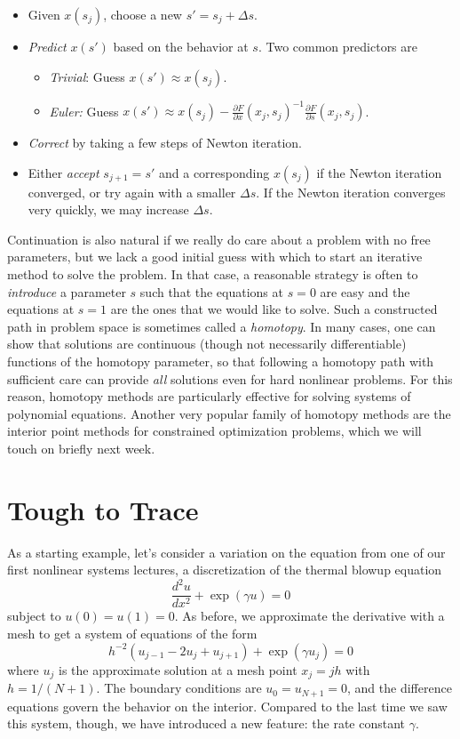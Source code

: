 \documentclass[12pt, leqno]{article} %
\providecommand{\tightlist}{%
  \setlength{\itemsep}{0pt}\setlength{\parskip}{0pt}}
\begin{document}
\begin{itemize}
\tightlist
\item
  Given \(x(s_j)\), choose a new \(s' = s_j + \Delta s\).
\item
  \emph{Predict} \(x(s')\) based on the behavior at \(s\). Two common
  predictors are

  \begin{itemize}
  \tightlist
  \item
    \emph{Trivial}: Guess \(x(s') \approx x(s_j)\).
  \item
    \emph{Euler:} Guess
    \(x(s') \approx x(s_j) - \frac{\partial F}{\partial x}(x_j,s_j)^{-1} \frac{\partial F}{\partial s}(x_j,s_j)\).
  \end{itemize}
\item
  \emph{Correct} by taking a few steps of Newton iteration.
\item
  Either \emph{accept} \(s_{j+1} = s'\) and a corresponding \(x(s_j)\)
  if the Newton iteration converged, or try again with a smaller
  \(\Delta s\). If the Newton iteration converges very quickly, we may
  increase \(\Delta s\).
\end{itemize}

Continuation is also natural if we really do care about a problem with
no free parameters, but we lack a good initial guess with which to start
an iterative method to solve the problem. In that case, a reasonable
strategy is often to \emph{introduce} a parameter \(s\) such that the
equations at \(s = 0\) are easy and the equations at \(s = 1\) are the
ones that we would like to solve. Such a constructed path in problem
space is sometimes called a \emph{homotopy}. In many cases, one can show
that solutions are continuous (though not necessarily differentiable)
functions of the homotopy parameter, so that following a homotopy path
with sufficient care can provide \emph{all} solutions even for hard
nonlinear problems. For this reason, homotopy methods are particularly
effective for solving systems of polynomial equations. Another very
popular family of homotopy methods are the interior point methods for
constrained optimization problems, which we will touch on briefly next
week.

\section{Tough to Trace}

As a starting example, let's consider a variation on the equation from
one of our first nonlinear systems lectures, a discretization of the
thermal blowup equation \[\frac{d^2 u}{dx^2} + \exp(\gamma u) = 0\]
subject to \(u(0) = u(1) = 0\). As before, we approximate the derivative
with a mesh to get a system of equations of the form
\[h^{-2} \left( u_{j-1}-2u_j+u_{j+1} \right) + \exp(\gamma u_j) = 0\]
where \(u_j\) is the approximate solution at a mesh point \(x_j = jh\)
with \(h = 1/(N+1)\). The boundary conditions are \(u_0 = u_{N+1} = 0\),
and the difference equations govern the behavior on the interior.
Compared to the last time we saw this system, though, we have introduced
a new feature: the rate constant \(\gamma\).
\end{document}
